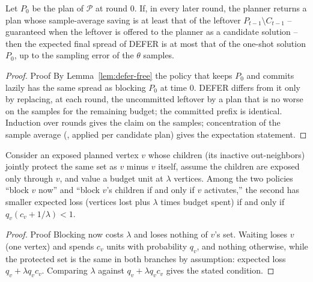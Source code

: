 \documentclass[ijoc,sglanonrev]{informs4}
\begin{document}
\begin{repeattheorem}
Let $P_0$ be the plan of $\mathcal P$ at round $0$. If, in every later
round, the planner returns a plan whose sample-average saving is at least
that of the leftover $P_{t-1}\setminus C_{t-1}$ -- guaranteed when the
leftover is offered to the planner as a candidate solution -- then the
expected final spread of DEFER is at most that of the one-shot solution
$P_0$, up to the sampling error of the $\theta$ samples.
\end{repeattheorem}
\begin{proof}{Proof}
By Lemma~\ref{lem:defer-free} the policy that keeps $P_0$ and commits
lazily has the same spread as blocking $P_0$ at time $0$. DEFER differs
from it only by replacing, at each round, the uncommitted leftover by a
plan that is no worse on the samples for the remaining budget; the
committed prefix is identical. Induction over rounds gives the claim on the
samples; concentration of the sample average (\citealp{xie2024}, applied
per candidate plan) gives the expectation statement.\Halmos
\end{proof}

\begin{repeatlemma}
Consider an exposed planned vertex $v$ whose children (its inactive
out-neighbors) jointly protect the same set as $v$ minus $v$ itself, assume
the children are exposed only through $v$, and value a budget unit at
$\lambda$ vertices. Among the two policies ``block $v$ now'' and ``block
$v$'s children if and only if $v$ activates,'' the second has smaller
expected loss (vertices lost plus $\lambda$ times budget spent) if and only
if $q_v(c_v+1/\lambda)<1$.
\end{repeatlemma}
\begin{proof}{Proof}
Blocking now costs $\lambda$ and loses nothing of $v$'s set. Waiting loses
$v$ (one vertex) and spends $c_v$ units with probability $q_v$, and nothing
otherwise, while the protected set is the same in both branches by
assumption: expected loss $q_v+\lambda q_v c_v$. Comparing $\lambda$ against
$q_v+\lambda q_v c_v$ gives the stated condition.\Halmos
\end{proof}
\end{document}
